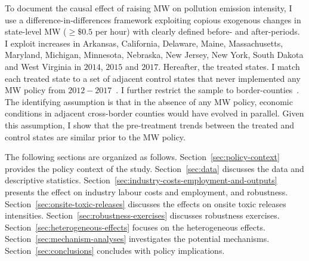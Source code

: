 \documentclass[12pt, english]{article}
\begin{document}
    To document the causal effect of raising MW on pollution emission intensity, I use a difference-in-differences framework exploiting copious exogenous changes in state-level MW ($\geq \$0.5$ per hour) with clearly defined before- and after-periods. I exploit increases in Arkansas, California, Delaware, Maine, Massachusetts, Maryland, Michigan, Minnesota, Nebraska, New Jersey, New York, South Dakota and West Virginia in $2014$, $2015$ and $2017$. Hereafter, the treated states. I match each treated state to a set of adjacent control states that never implemented any MW policy from $2012-2017$~\parencite{gopalan2021state}. I further restrict the sample to border-counties~\parencite{dube2010minimum}. The identifying assumption is that in the absence of any MW policy, economic conditions in adjacent cross-border counties would have evolved in parallel. Given this assumption, I show that the pre-treatment trends between the treated and control states are similar prior to the MW policy.



    The following sections are organized as follows. Section~\ref{sec:policy-context} provides the policy context of the study. Section~\ref{sec:data} discusses the data and descriptive statistics. Section~\ref{sec:industry-costs-employment-and-outputs} presents the effect on industry labour costs and employment, and robustness. Section~\ref{sec:onsite-toxic-releases} discusses the effects on onsite toxic releases intensities. Section~\ref{sec:robustness-exercises} discusses robustness exercises. Section~\ref{sec:heterogeneous-effects} focuses on the heterogeneous effects. Section~\ref{sec:mechanism-analyses} investigates the potential mechanisms. Section~\ref{sec:conclusions} concludes with policy implications.
\end{document}
